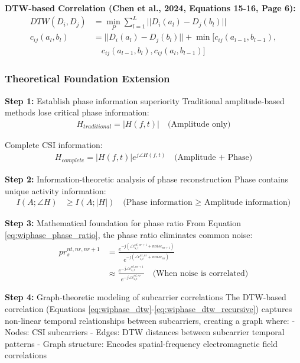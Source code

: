 \documentclass[12pt,a4paper]{article}
\begin{document}
\textbf{DTW-based Correlation (Chen et al., 2024, Equations 15-16, Page 6):}
\begin{align}
DTW(D_i, D_j) &= \min_P \sum_{l=1}^L ||D_i(a_l) - D_j(b_l)|| \label{eq:wiphase_dtw}\\
c_{ij}(a_l, b_l) &= ||D_i(a_l) - D_j(b_l)|| + \min[c_{ij}(a_{l-1}, b_{l-1}), \nonumber\\
&\quad c_{ij}(a_{l-1}, b_l), c_{ij}(a_l, b_{l-1})] \label{eq:wiphase_dtw_recursive}
\end{align}

\subsubsection{Theoretical Foundation Extension}

\textbf{Step 1:} Establish phase information superiority
Traditional amplitude-based methods lose critical phase information:
\begin{align}
H_{traditional} = |H(f,t)| \quad \text{(Amplitude only)} \label{eq:amplitude_only}
\end{align}

Complete CSI information:
\begin{align}
H_{complete} = |H(f,t)| e^{j\angle H(f,t)} \quad \text{(Amplitude + Phase)} \label{eq:complete_csi}
\end{align}

\textbf{Step 2:} Information-theoretic analysis of phase reconstruction
Phase contains unique activity information:
\begin{align}
I(A; \angle H) &\geq I(A; |H|) \quad \text{(Phase information ≥ Amplitude information)} \label{eq:phase_information_superiority}
\end{align}

\textbf{Step 3:} Mathematical foundation for phase ratio
From Equation \ref{eq:wiphase_phase_ratio}, the phase ratio eliminates common noise:
\begin{align}
pr_s^{nt,nr,nr+1} &= \frac{e^{-j(\angle c_{s,t}^{nt,nr+1} + noise_{nr+1})}}{e^{-j(\angle c_{s,t}^{nt,nr} + noise_{nr})}} \label{eq:phase_ratio_with_noise}\\
&\approx \frac{e^{-j\angle c_{s,t}^{nt,nr+1}}}{e^{-j\angle c_{s,t}^{nt,nr}}} \quad \text{(When noise is correlated)} \label{eq:phase_ratio_clean}
\end{align}

\textbf{Step 4:} Graph-theoretic modeling of subcarrier correlations
The DTW-based correlation (Equations \ref{eq:wiphase_dtw}-\ref{eq:wiphase_dtw_recursive}) captures non-linear temporal relationships between subcarriers, creating a graph where:
- Nodes: CSI subcarriers
- Edges: DTW distances between subcarrier temporal patterns
- Graph structure: Encodes spatial-frequency electromagnetic field correlations
\end{document}
